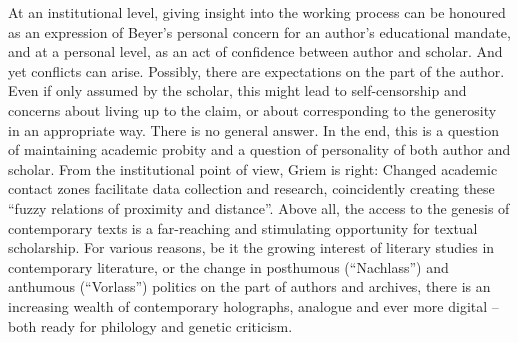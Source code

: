\documentclass{article}
\begin{document}
At an institutional level, giving insight into the working process can
be honoured as an expression of Beyer's personal concern for an author's
educational mandate, and at a personal level, as an act of confidence
between author and scholar. And yet conflicts can arise. Possibly, there
are expectations on the part of the author. Even if only assumed by
the scholar, this might lead to self-censorship and concerns about living
up to the claim, or about corresponding to the generosity in an appropriate
way. There is no general answer. In the end, this is a question of
maintaining academic probity and a question of personality of both
author and scholar. From the institutional point of view, Griem is
right: Changed academic contact zones facilitate data collection and
research, coincidently creating these ``fuzzy relations of proximity and
distance''. Above all, the access to the genesis of contemporary texts
is a far-reaching and stimulating opportunity for textual scholarship.
For various reasons, be it the growing interest of literary studies in
contemporary literature, or the change in posthumous (``Nachlass'') and
anthumous (``Vorlass'') politics on the part of authors and archives,
there is an increasing wealth of contemporary holographs, analogue and
ever more digital -- both ready for philology and genetic criticism.


\begin{flushleft}
    \renewcommand*{\mkbibnamefamily}[1]{\textsc{#1}}
    \renewcommand*{\mkbibnamegiven}[1]{\textsc{#1}} 
\printbibliography
\end{flushleft}
\end{document}
